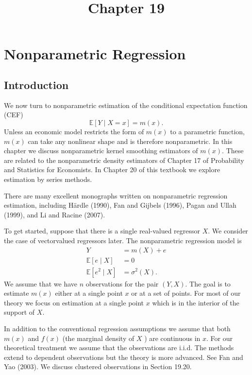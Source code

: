 \documentclass[10pt]{article}
\title{Chapter 19 }
\author{}
\date{}
\begin{document}
\maketitle
\section{Nonparametric Regression}
\subsection{Introduction}
We now turn to nonparametric estimation of the conditional expectation function (CEF)
$$
\mathbb{E}[Y \mid X=x]=m(x) .
$$
Unless an economic model restricts the form of $m(x)$ to a parametric function, $m(x)$ can take any nonlinear shape and is therefore nonparametric. In this chapter we discuss nonparametric kernel smoothing estimators of $m(x)$. These are related to the nonparametric density estimators of Chapter 17 of Probability and Statistics for Economists. In Chapter 20 of this textbook we explore estimation by series methods.

There are many excellent monographs written on nonparametric regression estimation, including Härdle (1990), Fan and Gijbels (1996), Pagan and Ullah (1999), and Li and Racine (2007).

To get started, suppose that there is a single real-valued regressor $X$. We consider the case of vectorvalued regressors later. The nonparametric regression model is
$$
\begin{aligned}
Y &=m(X)+e \\
\mathbb{E}[e \mid X] &=0 \\
\mathbb{E}\left[e^{2} \mid X\right] &=\sigma^{2}(X) .
\end{aligned}
$$
We assume that we have $n$ observations for the pair $(Y, X)$. The goal is to estimate $m(x)$ either at a single point $x$ or at a set of points. For most of our theory we focus on estimation at a single point $x$ which is in the interior of the support of $X$.

In addition to the conventional regression assumptions we assume that both $m(x)$ and $f(x)$ (the marginal density of $X$ ) are continuous in $x$. For our theoretical treatment we assume that the observations are i.i.d. The methods extend to dependent observations but the theory is more advanced. See Fan and Yao (2003). We discuss clustered observations in Section 19.20.
\end{document}
